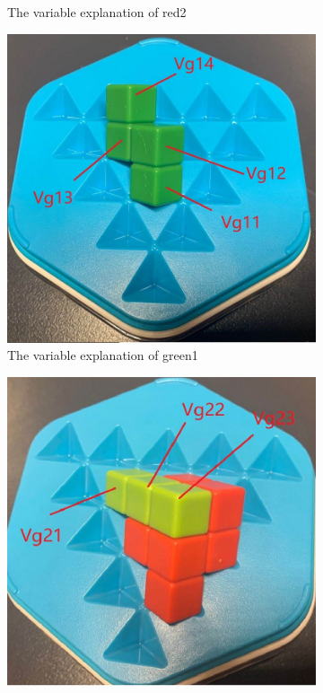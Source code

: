 \begin{figure}[htbp]
\begin{subfigure}[b]{0.25\textwidth}
\caption{The variable explanation of red2}
  \label{fig:3Dred2}
\end{subfigure}
\begin{subfigure}[b]{0.25\textwidth}
\centering
\includegraphics[width=\textwidth]{figs/3Dgreen1.jpg}
\caption{The variable explanation of green1}
  \label{fig:3Dgreen1}
\end{subfigure}
\begin{subfigure}[b]{0.25\textwidth}
\centering
\includegraphics[width=\textwidth]{figs/3Dgreen2.jpg}

\end{subfigure}
\end{figure}
